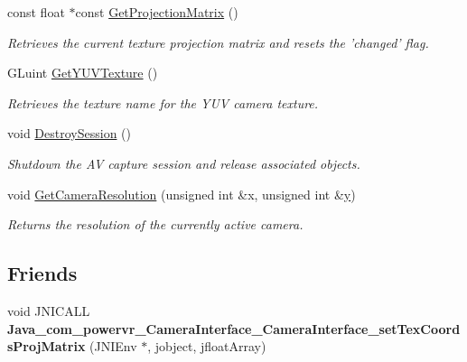 \begin{DoxyCompactItemize}
const float $\ast$const \hyperlink{class_c_p_v_r_t_camera_interface_android_a6955185f76dc94c30277df66ce3fcb8a}{Get\+Projection\+Matrix} ()
\begin{DoxyCompactList}\small\item\em Retrieves the current texture projection matrix and resets the 'changed' flag. \end{DoxyCompactList}\item 
G\+Luint \hyperlink{class_c_p_v_r_t_camera_interface_android_acde4391be3e57f3b04ef47ceb748ab08}{Get\+Y\+U\+V\+Texture} ()
\begin{DoxyCompactList}\small\item\em Retrieves the texture name for the Y\+U\+V camera texture. \end{DoxyCompactList}\item 
void \hyperlink{class_c_p_v_r_t_camera_interface_android_a9c52bfa6882b9a39fd44b3a18b9dcac7}{Destroy\+Session} ()
\begin{DoxyCompactList}\small\item\em Shutdown the A\+V capture session and release associated objects. \end{DoxyCompactList}\item 
void \hyperlink{class_c_p_v_r_t_camera_interface_android_ae70d28695a548e6e3a7bfe855872238b}{Get\+Camera\+Resolution} (unsigned int \&x, unsigned int \&\hyperlink{_ice_utils_8h_aa7ffaed69623192258fb8679569ff9ba}{y})
\begin{DoxyCompactList}\small\item\em Returns the resolution of the currently active camera. \end{DoxyCompactList}\end{DoxyCompactItemize}
\subsection*{Friends}
\begin{DoxyCompactItemize}
\item 
\hypertarget{class_c_p_v_r_t_camera_interface_android_aefcdf8d99e652e0730684354e25850cd}{void J\+N\+I\+C\+A\+L\+L {\bfseries Java\+\_\+com\+\_\+powervr\+\_\+\+Camera\+Interface\+\_\+\+Camera\+Interface\+\_\+set\+Tex\+Coords\+Proj\+Matrix} (J\+N\+I\+Env $\ast$, jobject, jfloat\+Array)}\label{class_c_p_v_r_t_camera_interface_android_aefcdf8d99e652e0730684354e25850cd}

\end{DoxyCompactItemize}


